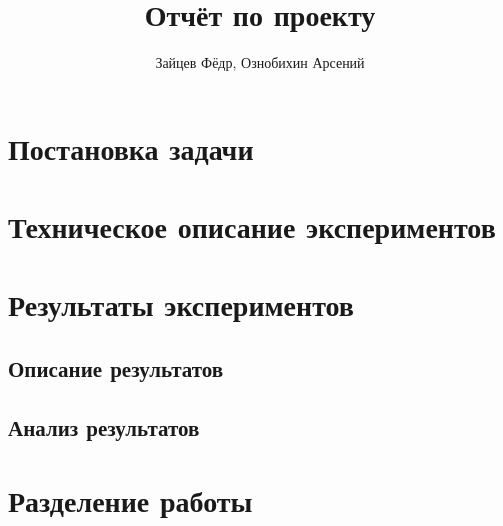 \documentclass[a4paper]{article}
\title{Отчёт по проекту}
\author{Зайцев Фёдр, Ознобихин Арсений}
\begin{document}
    \maketitle{}
    \tableofcontents
    \newpage

    \section{Постановка задачи}



    \section{Техническое описание экспериментов}



    \section{Результаты экспериментов}
    \subsection{Описание результатов}

    \subsection{Анализ результатов}



    \section{Разделение работы}
\end{document}
